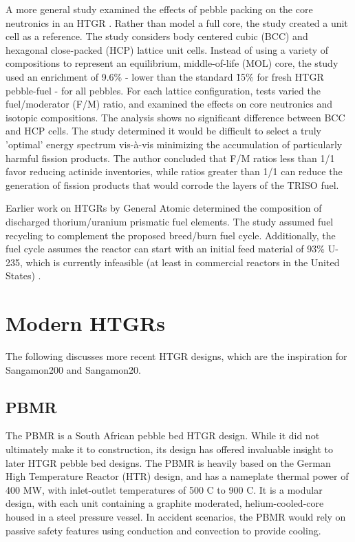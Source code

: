 A more general study examined the effects of pebble packing on the core neutronics in an HTGR \cite{turkmen_effect_2012}.  Rather than model a full core, the study created a unit cell as a reference.  The study considers body centered cubic (BCC) and hexagonal close-packed (HCP) lattice unit cells.  Instead of using a variety of compositions to represent an equilibrium, middle-of-life (MOL) core, the study used an enrichment of 9.6\%  - lower than the standard \~15\% for fresh HTGR pebble-fuel - for all pebbles.  For each lattice configuration, tests varied the fuel/moderator (F/M) ratio, and examined the effects on core neutronics and isotopic compositions.  The analysis shows no significant difference between BCC and HCP cells.  The study determined it would be difficult to select a truly 'optimal' energy spectrum vis-\`{a}-vis minimizing the accumulation of particularly harmful fission products.  The author concluded that F/M ratios less than 1/1 favor reducing actinide inventories, while ratios greater than 1/1 can reduce the generation of fission products that would corrode the layers of the TRISO fuel.

Earlier work on HTGRs by General Atomic determined the composition of discharged thorium/uranium prismatic fuel elements.  The study assumed fuel recycling to complement the proposed breed/burn fuel cycle.  Additionally, the fuel cycle assumes the reactor can start with an initial feed material of 93\% U-235, which is currently infeasible (at least in commercial reactors in the United States) \cite{hamilton_htgr_1976}.


\section{Modern HTGRs}

The following discusses more recent HTGR designs, which are the inspiration for Sangamon200 and Sangamon20.

\subsection{PBMR}

The PBMR is a South African pebble bed HTGR design.  While it did not ultimately make it to construction, its design has offered invaluable insight to later HTGR pebble bed designs.  The PBMR is heavily based on the German High Temperature Reactor (HTR) design, and has a nameplate thermal power of 400 MW, with inlet-outlet temperatures of 500 \textdegree C to 900 \textdegree C.  It is a modular design, with each unit containing a graphite moderated, helium-cooled-core housed in a steel pressure vessel.  In accident scenarios, the PBMR would rely on passive safety features using conduction and convection to provide cooling.


